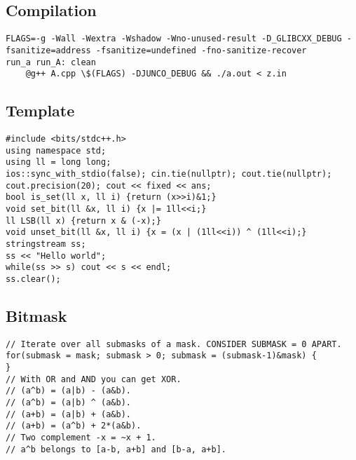 \documentclass[a4paper]{article}
\begin{document}
\subsection*{Compilation}
\begin{verbatim}
FLAGS=-g -Wall -Wextra -Wshadow -Wno-unused-result -D_GLIBCXX_DEBUG -fsanitize=address -fsanitize=undefined -fno-sanitize-recover
run_a run_A: clean
	@g++ A.cpp \$(FLAGS) -DJUNCO_DEBUG && ./a.out < z.in
\end{verbatim}
\subsection*{Template}
\begin{multicols}{2}
\begin{verbatim}
#include <bits/stdc++.h>
using namespace std;
using ll = long long;
ios::sync_with_stdio(false); cin.tie(nullptr); cout.tie(nullptr);
cout.precision(20); cout << fixed << ans;
bool is_set(ll x, ll i) {return (x>>i)&1;}
void set_bit(ll &x, ll i) {x |= 1ll<<i;}
ll LSB(ll x) {return x & (-x);}
void unset_bit(ll &x, ll i) {x = (x | (1ll<<i)) ^ (1ll<<i);}
stringstream ss;
ss << "Hello world";
while(ss >> s) cout << s << endl;
ss.clear();
\end{verbatim}
\end{multicols}
\subsection*{Bitmask}
\begin{multicols}{2}
\begin{verbatim}
// Iterate over all submasks of a mask. CONSIDER SUBMASK = 0 APART.
for(submask = mask; submask > 0; submask = (submask-1)&mask) {
}
// With OR and AND you can get XOR. 
// (a^b) = (a|b) - (a&b).
// (a^b) = (a|b) ^ (a&b).
// (a+b) = (a|b) + (a&b).
// (a+b) = (a^b) + 2*(a&b).
// Two complement -x = ~x + 1.
// a^b belongs to [a-b, a+b] and [b-a, a+b].
\end{verbatim}
\end{multicols}
\end{document}
